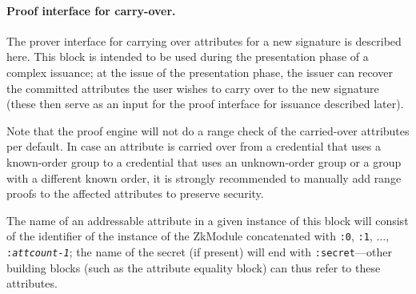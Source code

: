     \paragraph{Proof interface for carry-over.}
    The prover interface for carrying over attributes for a new signature is described here.
    This block is intended to be used during the presentation phase of a complex issuance;
    at the issue of the presentation phase, the issuer can recover the committed attributes
    the user wishes to carry over to the new signature (these then serve as an input for
    the proof interface for issuance described later).

    Note that the proof engine will not do a range check of the carried-over attributes
    per default. In case an attribute is carried over from a credential that uses
    a known-order group to a credential that uses an unknown-order group or a group
    with a different known order, it is strongly recommended to manually add
    range proofs to the affected attributes to preserve security.

    The name of an addressable attribute in a given instance of this block
    will consist of the identifier of the instance of the ZkModule concatenated
    with \texttt{:0}, \texttt{:1}, $\ldots$, \texttt{:\emph{attcount-1}};
    the name of the secret (if present) will end with \texttt{:secret}---other
    building blocks (such as the attribute equality block) can thus refer to these
    attributes.

